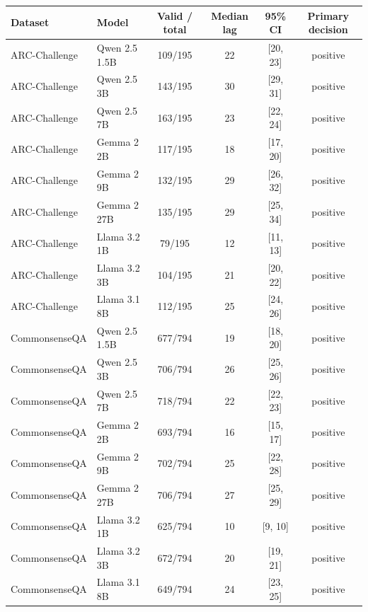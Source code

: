 \begin{tabularx}{\textwidth}{@{}llcccc@{}}
\toprule
Dataset & Model & Valid / total & Median lag & 95\% CI & Primary decision \\
\midrule
ARC-Challenge & Qwen 2.5 1.5B & 109/195 & 22 & [20, 23] & positive \\
ARC-Challenge & Qwen 2.5 3B & 143/195 & 30 & [29, 31] & positive \\
ARC-Challenge & Qwen 2.5 7B & 163/195 & 23 & [22, 24] & positive \\
ARC-Challenge & Gemma 2 2B & 117/195 & 18 & [17, 20] & positive \\
ARC-Challenge & Gemma 2 9B & 132/195 & 29 & [26, 32] & positive \\
ARC-Challenge & Gemma 2 27B & 135/195 & 29 & [25, 34] & positive \\
ARC-Challenge & Llama 3.2 1B & 79/195 & 12 & [11, 13] & positive \\
ARC-Challenge & Llama 3.2 3B & 104/195 & 21 & [20, 22] & positive \\
ARC-Challenge & Llama 3.1 8B & 112/195 & 25 & [24, 26] & positive \\
CommonsenseQA & Qwen 2.5 1.5B & 677/794 & 19 & [18, 20] & positive \\
CommonsenseQA & Qwen 2.5 3B & 706/794 & 26 & [25, 26] & positive \\
CommonsenseQA & Qwen 2.5 7B & 718/794 & 22 & [22, 23] & positive \\
CommonsenseQA & Gemma 2 2B & 693/794 & 16 & [15, 17] & positive \\
CommonsenseQA & Gemma 2 9B & 702/794 & 25 & [22, 28] & positive \\
CommonsenseQA & Gemma 2 27B & 706/794 & 27 & [25, 29] & positive \\
CommonsenseQA & Llama 3.2 1B & 625/794 & 10 & [9, 10] & positive \\
CommonsenseQA & Llama 3.2 3B & 672/794 & 20 & [19, 21] & positive \\
CommonsenseQA & Llama 3.1 8B & 649/794 & 24 & [23, 25] & positive \\
\bottomrule
\end{tabularx}
